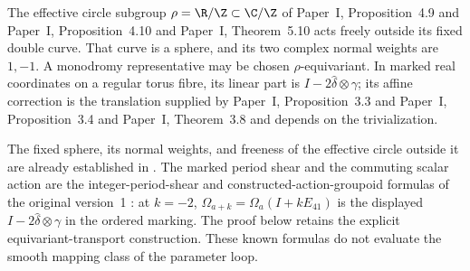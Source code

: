 \begin{proposition}\label{push:src:C.3.1}
The effective circle subgroup $\rho=\R/\Z\subset\C/\Z$ of Paper~I, Proposition~4.9 and Paper~I, Proposition~4.10 and Paper~I, Theorem~5.10
acts freely outside its fixed double curve. That curve is a sphere,
and its two complex normal weights are $1,-1$. A monodromy
representative may be chosen $\rho$-equivariant. In marked real
coordinates on a regular torus fibre, its linear part is
$I-2\widehat\delta\otimes\gamma$; its affine correction is the
translation supplied by Paper~I, Proposition~3.3 and Paper~I, Proposition~3.4 and Paper~I, Theorem~3.8 and depends on the trivialization.
\end{proposition}

The fixed sphere, its normal weights, and freeness of the effective circle outside it are already established in \citet[Proposition~9.24 and Remark~9.25, pp.~82--83]{AC26}. The marked period shear and the commuting scalar action are the integer-period-shear and constructed-action-groupoid formulas of the original version~1 \citep[Section~7]{DuEtAl2026v1}: at $k=-2$, $\Omega_{a+k}=\Omega_a(I+kE_{41})$ is the displayed $I-2\widehat\delta\otimes\gamma$ in the ordered marking. The proof below retains the explicit equivariant-transport construction. These known formulas do not evaluate the smooth mapping class of the parameter loop.


